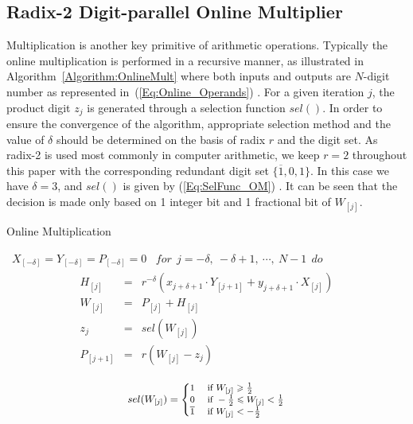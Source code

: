 \documentclass{acm_proc_article-sp}
\begin{document}
\subsection{Radix-2 Digit-parallel Online Multiplier}
Multiplication is another key primitive of arithmetic operations. Typically the online multiplication is performed in a recursive manner, as illustrated in Algorithm~\ref{Algorithm:OnlineMult} where both inputs and outputs are $N$-digit number as represented in~(\ref{Eq:Online_Operands}) \cite{Ercegovac_Book,Ercegovac_OnlineVLSI}. For a given iteration $j$, the product digit $z_j$ is generated through a selection function $sel()$. In order to ensure the convergence of the algorithm, appropriate selection method and the value of $\delta$ should be determined on the basis of radix $r$ and the digit set. As radix-2 is used most commonly in computer arithmetic, we keep $r=2$ throughout this paper with the corresponding redundant digit set $\{\overline{1},0,1\}$. In this case we have $\delta=3$, and $sel()$ is given by (\ref{Eq:SelFunc_OM}) \cite{Oregon_OnlineNetwork}. It can be seen that the decision is made only based on 1 integer bit and 1 fractional bit of $W_{[j]}$.
%
\begin{algorithm}[tbp]
  \caption{Online Multiplication}
  \begin{algorithmic}[1]
    \REQUIRE~$X_{[-\delta]}=Y_{[-\delta]}=P_{[-\delta]}=0$
    \ENSURE~$for~~ j=-\delta,~-\delta+1,~\cdots,~N-1 ~~do$
      \begin{eqnarray}\label{Eq:OnlineMult_General}
        \begin{matrix}
          H_{[j]}   & = & r^{-\delta}\left(x_{j+\delta+1}\cdot Y_{[j+1]}+y_{j+\delta+1}\cdot X_{[j]}\right)\\
          W_{[j]}   & = & P_{[j]} + H_{[j]}\\
          z_j       & = & sel(W_{[j]})\\
          P_{[j+1]} & = & r\left(W_{[j]}-z_j\right)
        \end{matrix}
      \end{eqnarray}
  \label{Algorithm:OnlineMult}
  \end{algorithmic}
\end{algorithm}
%
\begin{eqnarray}\label{Eq:SelFunc_OM}
\small
  sel(W_{[j]})=\begin{cases}
    1 & \text{ if } W_{[j]} \geqslant \frac{1}{2} \\
    0 & \text{ if } -\frac{1}{2}\leqslant W_{[j]}<\frac{1}{2} \\
    \overline{1} & \text{ if } W_{[j]}<-\frac{1}{2}
  \end{cases}
\normalsize
\end{eqnarray}
\end{document}
